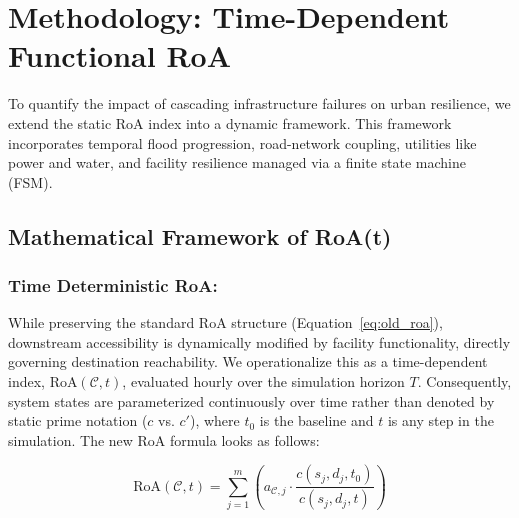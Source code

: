 
\newpage


\section{Methodology: Time-Dependent Functional RoA}
\label{sec:methodology}


To quantify the impact of cascading infrastructure failures on urban resilience, we extend the static RoA index into a dynamic framework.
This framework incorporates temporal flood progression, road-network coupling, utilities like power and water, and facility resilience managed via a finite state machine (FSM).

\subsection{Mathematical Framework of RoA(t)}
\label{subsec:mathematical-framework-of-roa-t}

\subsubsection{Time Deterministic RoA:}
While preserving the standard RoA structure (Equation~\ref{eq:old_roa}), downstream accessibility is dynamically modified by facility functionality, directly governing destination reachability.
We operationalize this as a time-dependent index, $\text{RoA}(\mathcal{C}, t)$, evaluated hourly over the simulation horizon $T$.
Consequently, system states are parameterized continuously over time rather than denoted by static prime notation ($c$ vs. $c'$), where $t_0$ is the baseline and $t$ is any step in the simulation.
The new RoA formula looks as follows:

\begin{equation}
    \text{RoA}(\mathcal{C}, t) = \sum_{j=1}^{m} \left( a_{\mathcal{C},j} \cdot \frac{c(s_{j},d_{j}, t_0)}{c(s_j, d_j, t)} \right)\label{eq:new_roa}
\end{equation}

